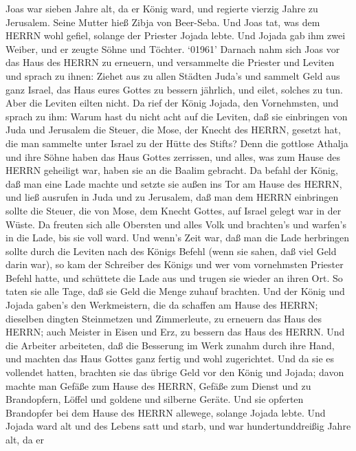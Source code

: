  Joas war sieben Jahre alt, da er König ward, und regierte
vierzig Jahre zu Jerusalem. Seine Mutter hieß Zibja von Beer-Seba.
 Und Joas tat, was dem HERRN wohl gefiel, solange der
Priester Jojada lebte.  Und Jojada gab ihm zwei Weiber, und
er zeugte Söhne und Töchter.  `01961' Darnach nahm sich Joas
vor das Haus des HERRN zu erneuern,  und versammelte die
Priester und Leviten und sprach zu ihnen: Ziehet aus zu allen Städten
Juda's und sammelt Geld aus ganz Israel, das Haus eures Gottes zu
bessern jährlich, und eilet, solches zu tun. Aber die Leviten eilten
nicht.  Da rief der König Jojada, den Vornehmsten, und
sprach zu ihm: Warum hast du nicht acht auf die Leviten, daß sie
einbringen von Juda und Jerusalem die Steuer, die Mose, der Knecht des
HERRN, gesetzt hat, die man sammelte unter Israel zu der Hütte des
Stifts?  Denn die gottlose Athalja und ihre Söhne haben das
Haus Gottes zerrissen, und alles, was zum Hause des HERRN geheiligt war,
haben sie an die Baalim gebracht.  Da befahl der König, daß
man eine Lade machte und setzte sie außen ins Tor am Hause des HERRN,
 und ließ ausrufen in Juda und zu Jerusalem, daß man dem
HERRN einbringen sollte die Steuer, die von Mose, dem Knecht Gottes, auf
Israel gelegt war in der Wüste.  Da freuten sich alle
Obersten und alles Volk und brachten's und warfen's in die Lade, bis sie
voll ward.  Und wenn's Zeit war, daß man die Lade
herbringen sollte durch die Leviten nach des Königs Befehl (wenn sie
sahen, daß viel Geld darin war), so kam der Schreiber des Königs und wer
vom vornehmsten Priester Befehl hatte, und schüttete die Lade aus und
trugen sie wieder an ihren Ort. So taten sie alle Tage, daß sie Geld die
Menge zuhauf brachten.  Und der König und Jojada gaben's
den Werkmeistern, die da schaffen am Hause des HERRN; dieselben dingten
Steinmetzen und Zimmerleute, zu erneuern das Haus des HERRN; auch
Meister in Eisen und Erz, zu bessern das Haus des HERRN. 
Und die Arbeiter arbeiteten, daß die Besserung im Werk zunahm durch ihre
Hand, und machten das Haus Gottes ganz fertig und wohl zugerichtet.
 Und da sie es vollendet hatten, brachten sie das übrige
Geld vor den König und Jojada; davon machte man Gefäße zum Hause des
HERRN, Gefäße zum Dienst und zu Brandopfern, Löffel und goldene und
silberne Geräte. Und sie opferten Brandopfer bei dem Hause des HERRN
allewege, solange Jojada lebte.  Und Jojada ward alt und
des Lebens satt und starb, und war hundertunddreißig Jahre alt, da er
